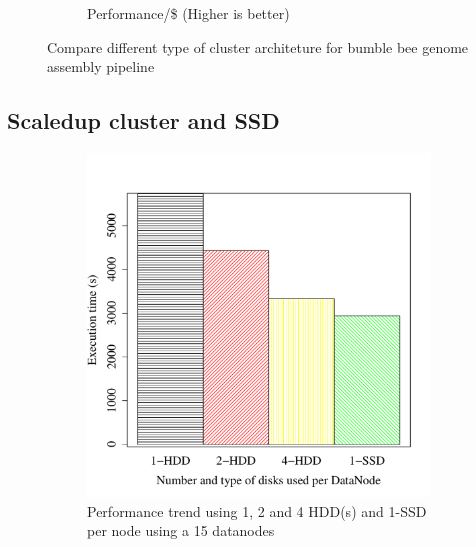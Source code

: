 \documentclass[conference]{IEEEtran}
\begin{document}
\begin{figure}[htb]
\begin{subfigure}[b]{0.5\textwidth}
                \caption{Performance/\$ (Higher is better)}
                \label{fig:DifferentArchitecturesPerfPerDollar}
        \end{subfigure}
        \caption{Compare different type of cluster architeture for bumble bee genome assembly pipeline}
  \label{fig:DifferentArchitectures}
\end{figure}

\subsection {Scaledup cluster and SSD} \label{ScaledupClusterAndSSD}
\begin{figure}[h]
  \centering
  \begin{subfigure}[b]{0.23\textwidth}
          \includegraphics[width=\textwidth]{Figure/PerormanceData/Plots/SSDHDDSameNode.pdf}
          \caption{Performance trend using 1, 2 and 4 HDD(s) and 1-SSD per node using a 15 datanodes}
          \label{fig:SsdN4Hdd}
  \end{subfigure}
  \begin{subfigure}[b]{0.23\textwidth}

\end{subfigure}
\end{figure}
\end{document}
